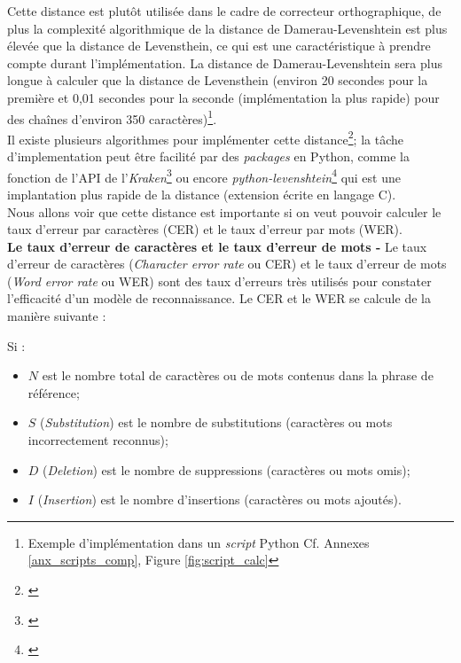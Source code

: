 Cette distance est plutôt utilisée dans le cadre de correcteur orthographique, de plus la complexité algorithmique de la distance de Damerau-Levenshtein est plus élevée que la distance de Levensthein, ce qui est une caractéristique à prendre compte durant l'implémentation. La distance de Damerau-Levenshtein sera plus longue à calculer que la distance de Levensthein (environ 20 secondes pour la première et 0,01 secondes pour la seconde (implémentation la plus rapide) pour des chaînes d'environ 350 caractères)\footnote{Exemple d'implémentation dans un \textit{script} Python Cf. Annexes \ref{anx_scripts_comp}, Figure \ref{fig:script_calc}}.\\

Il existe plusieurs algorithmes pour implémenter cette distance\footnote{\cite{wikibooks_algorithm_2020}}; la tâche d'implementation peut être facilité par des \textit{packages} en Python, comme la fonction  de l'API de l'\textit{Kraken}\footnote{\cite{noauthor_kraken_nodate}} ou encore  \textit{python-levenshtein}\footnote{\cite{noauthor_python-levenshtein_nodate}} qui est une implantation plus rapide de la distance (extension écrite en langage C).\\

Nous allons voir que cette distance est importante si on veut pouvoir calculer le taux d'erreur par caractères (CER) et le taux d'erreur par mots (WER).\\ 

\textbf{Le taux d'erreur de caractères et le taux d'erreur de mots -} Le taux d'erreur de caractères (\textit{Character error rate} ou CER) et le taux d'erreur de mots (\textit{Word error rate} ou WER) sont des taux d'erreurs très utilisés pour constater l'efficacité d'un modèle de reconnaissance. Le CER et le WER se calcule de la manière suivante :

Si : 

\begin{itemize}
    \item $N$ est le nombre total de caractères ou de mots contenus dans la phrase de référence;
    \item $S$ (\textit{Substitution}) est le nombre de substitutions (caractères ou mots incorrectement reconnus);
    \item $D$ (\textit{Deletion}) est le nombre de suppressions (caractères ou mots omis);
    \item $I$ (\textit{Insertion}) est le nombre d'insertions (caractères ou mots ajoutés).
\end{itemize}

